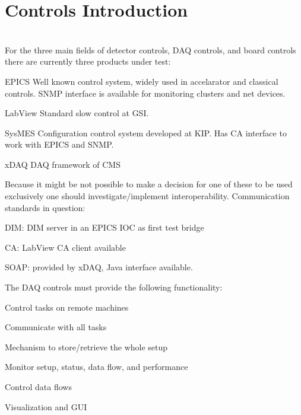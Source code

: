 \section{Controls Introduction}
\\
For the three main fields of detector controls, DAQ controls, and
board controls there are currently three products under test:
\begin{compactdesc}
\item[EPICS] Well known control system, widely used in accelarator
and classical controls. SNMP interface is available for monitoring
clusters and net devices. \item[LabView] Standard slow control at
GSI. \item[SysMES] Configuration control system developed at KIP.
Has CA interface to work with EPICS and SNMP. \item[xDAQ] DAQ
framework of CMS
\end{compactdesc}
Because it might be not possible to make a decision for one of
these to be used exclusively one should investigate/implement
interoperability. Communication standards in question:
\begin{compactitem}
\item DIM: DIM server in an EPICS IOC as first test bridge 
\item CA: LabView CA client available 
\item SOAP: provided by xDAQ, Java interface available.
\end{compactitem}
The DAQ controls must provide the following functionality:
\begin{compactitem}
\item Control tasks on remote machines
\item Communicate with all tasks
\item Mechanism to store/retrieve the whole setup
\item Monitor setup, status, data flow, and performance
\item Control data flows
\item Visualization and GUI
\end{compactitem}


